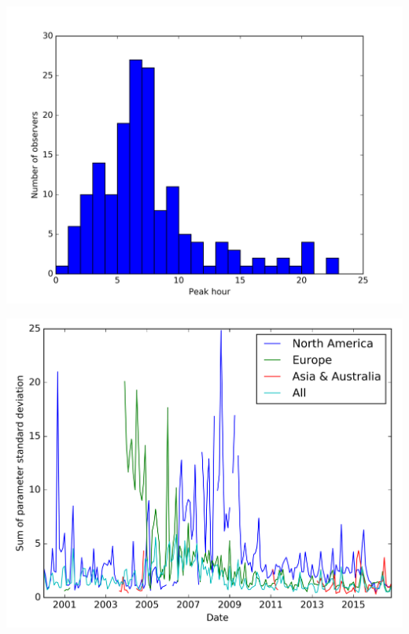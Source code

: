 \documentclass{beamer}
\begin{document}
	\begin{frame}
		\centering
		\includegraphics[width=\linewidth]{hist}
	\end{frame}
	
	\begin{frame}
		\centering
		\includegraphics[width=\linewidth]{COMBINEDfit}
	\end{frame}
	
\end{document}
